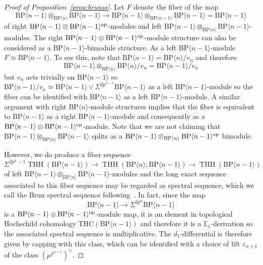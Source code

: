 \documentclass[11pt]{amsart}
\newcommand{\mr}[1]{\mathrm{#1}}
\newcommand{\BP}{\mr{BP}}
\DeclareMathOperator{\THH}{THH}
\newcommand{\op}{\textup{op}}
\theoremstyle{definition}
\numberwithin{equation}{section}
\numberwithin{figure}{section}
\begin{document}
\begin{proof}[Proof of Proposition~\ref{prop:brunss}]
Let $F$ denote the fiber of the map 
\[ 
\BP\langle n-1\rangle\otimes_{\BP\langle n\rangle}\BP\langle n-1\rangle \longrightarrow \BP\langle n-1\rangle \otimes_{\BP\langle n-1\rangle}\BP\langle n-1\rangle =\BP\langle n-1\rangle 
\]
of right $\mathrm{BP}\langle n-1\rangle \otimes \mathrm{BP}\langle n-1\rangle^{\op}$-modules and left $\BP\langle n-1\rangle\otimes_{\BP\langle n\rangle}\BP\langle n-1\rangle$-modules. The right $\mathrm{BP}\langle n-1\rangle \otimes \mathrm{BP}\langle n-1\rangle^{\op}$-module structure can also be considered as a $\mathrm{BP}\langle n-1\rangle$-bimodule structure. As a left $\mathrm{BP}\langle n-1\rangle$-module $F\simeq \mathrm{BP}\langle n-1\rangle$. To see this, note that $\mathrm{BP}\langle n-1 \rangle=\mathrm{BP}\langle n\rangle/v_n$ and therefore 
\[ \mathrm{BP}\langle n-1 \rangle\otimes_{\mathrm{BP}\langle n\rangle} \mathrm{BP}\langle n\rangle/v_n=\mathrm{BP}\langle n-1 \rangle/v_n\]
but $v_n$ acts trivially on $\mathrm{BP}\langle n-1 \rangle$ so $\mathrm{BP}\langle n-1 \rangle/v_n\simeq \mathrm{BP}\langle n-1 \rangle\vee \Sigma^{2p^{n-1}}\mathrm{BP}\langle n-1 \rangle$ as a left $\mathrm{BP}\langle n-1 \rangle$-module so the fiber can be identified with $\mathrm{BP}\langle n-1 \rangle$ as a left $\mathrm{BP}\langle n-1 \rangle$-module. A similar argument with right 
$\mathrm{BP}\langle n\rangle$-module structures implies that the fiber is equivalent to $\mathrm{BP}\langle n-1\rangle$ as a right $\mathrm{BP}\langle n-1\rangle$-module and consequently as a $\mathrm{BP}\langle n-1\rangle\otimes \mathrm{BP}\langle n-1\rangle^{\op}$-module. Note that we are not claiming that $\mathrm{BP}\langle n-1\rangle \otimes_{\mathrm{BP}\langle n\rangle}\mathrm{BP}\langle n-1\rangle$ splits as a $\mathrm{BP}\langle n-1\rangle \otimes_{\mathrm{BP}\langle n\rangle}\mathrm{BP}\langle n-1\rangle^{\op}$ bimodule. 

However, we do produce a fiber sequence 
\[ 
\Sigma^{2p^{n}-1}\THH(\BP\langle n-1 \rangle)\to  \THH( \mathrm{BP}\langle n \rangle;\mathrm{BP}\langle n-1 \rangle)\longrightarrow \THH(\BP\langle n-1 \rangle)
\]
of left $\BP\langle n-1\rangle \otimes_{\BP\langle n \rangle }\BP\langle n-1\rangle $-modules 
and the long exact sequence associated to this fiber sequence may be regarded as spectral sequence, which we call the Brun spectral sequence following~\cite{Hon20}. In fact, since the map 
\[ \mathrm{BP}\langle n-1\rangle \to \Sigma^{2p^{n}}\mathrm{BP}\langle n-1\rangle 
\]
is a $\mathrm{BP}\langle n-1\rangle \otimes \mathrm{BP}\langle n-1\rangle^{\op}$-module map, it is an element in topological Hochschild cohomology $\mathrm{THC}(\mathrm{BP}\langle n-1\rangle)$ and therefore it is a $\mathbb{E}_1$-derivation so the associated spectral sequence is multiplicative. The $d_1$-differential is therefore given by capping with this class, which can be identified with a choice of lift $\varepsilon_{n+1}$ of the class $(\mu^{p^{n+1}})^{\vee}$. 
\end{proof}
\end{document}
